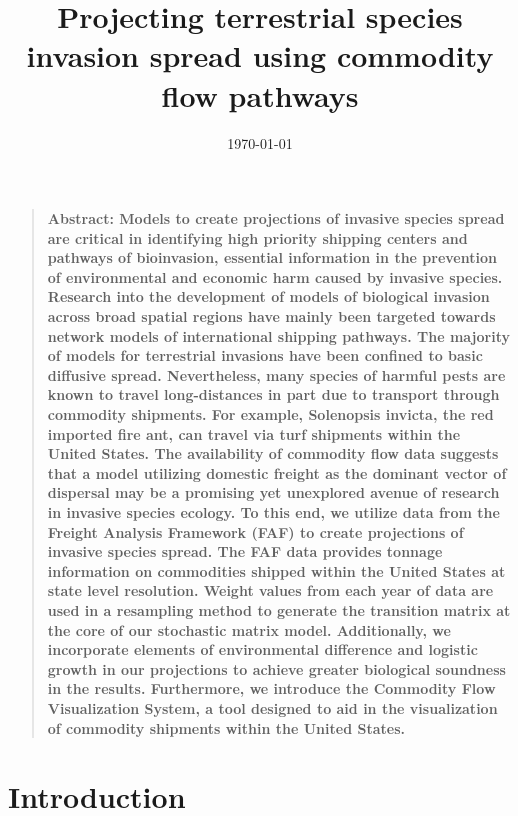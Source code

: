 \documentclass[12pt]{article}
\title{Projecting terrestrial species invasion spread using commodity flow pathways}
\author
{Ashish Gauli,$^{1,2}$ Nathan Wikle,$^{1,3}$ Ryan Yan,$^{1,4}$\\ 
Dr. Louis Gross,$^{1,5}$ Dr. Daniel Simberloff,$^{5}$ Angela Chuang,$^{5}$ Cedric Landerer$^{5}$\\
\\
\normalsize{$^{1}$National Institute for Mathematical and Biological Synthesis (NIMBioS)}\\
\normalsize{$^{2}$Biology and Computer Science, Fisk University}\\
\normalsize{$^{3}$Mathematics, Truman State University}\\
\normalsize{$^{4}$Mathematical Biology, College of William and Mary}\\
\normalsize{$^{5}$Ecology and Evolutionary Biology, University of Tennessee}\\
\\
}
\date{\today}
\newenvironment{sciabstract}{%
\begin{quote} \bf}
{\end{quote}}
\begin{document}
 


\baselineskip24pt


\maketitle 


 \begin{sciabstract}
Abstract: Models to create projections of invasive species spread are critical in identifying high priority shipping centers and pathways of bioinvasion, essential information in the prevention of environmental and economic harm caused by invasive species. Research into the development of models of biological invasion across broad spatial regions have mainly been targeted towards network models of international shipping pathways. The majority of models for terrestrial invasions have been confined to basic diffusive spread. Nevertheless, many species of harmful pests are known to travel long-distances in part due to transport through commodity shipments. For example, Solenopsis invicta, the red imported fire ant, can travel via turf shipments within the United States. The availability of commodity flow data suggests that a model utilizing domestic freight as the dominant vector of dispersal may be a promising yet unexplored avenue of research in invasive species ecology. To this end, we utilize data from the Freight Analysis Framework (FAF) to create projections of invasive species spread. The FAF data provides tonnage information on commodities shipped within the United States at state level resolution. Weight values from each year of data are used in a resampling method to generate the transition matrix at the core of our stochastic matrix model. Additionally, we incorporate elements of environmental difference and logistic growth in our projections to achieve greater biological soundness in the results. Furthermore, we introduce the Commodity Flow Visualization System, a tool designed to aid in the visualization of commodity shipments within the United States.
\end{sciabstract}



\section*{Introduction}
\end{document}
